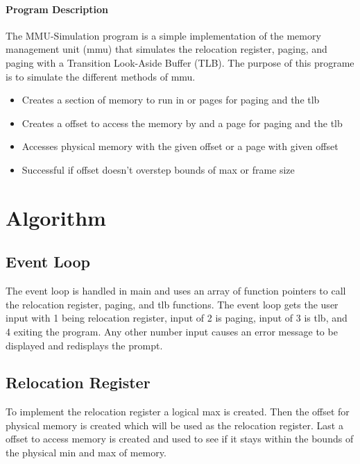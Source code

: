 




\begin{multicols}{2}

\paragraph{Program Description}
The MMU-Simulation program is a simple implementation of the memory management unit (mmu) that simulates the relocation register, paging, and paging with a Transition Look-Aside Buffer (TLB). The purpose of this programe is to simulate the different methods of mmu.
\begin{itemize}
\item 	Creates a section of memory to run in or pages for paging and the tlb

\item	Creates a offset to access the memory by and a page for paging and the tlb

\item	Accesses physical memory with the given offset or a page with given offset

\item	Successful if offset doesn't overstep bounds of max or frame size
\end{itemize}

\section{Algorithm}\label{algorithm}
\subsection{Event Loop}\label{event_loop}
The event loop is handled in main and uses an array of function pointers to call the relocation register, paging, and tlb functions. The event loop gets the user input with 1 being relocation register, input of 2 is paging, input of 3 is tlb, and 4 exiting the program. Any other number input causes an error message to be displayed and redisplays the prompt.

\subsection{Relocation Register}
To implement the relocation register a logical max is created. Then the offset for physical memory is created which will be used as the relocation register. Last a offset to access memory is created and used to see if it stays within the bounds of the physical min and max of memory.


\end{multicols}
